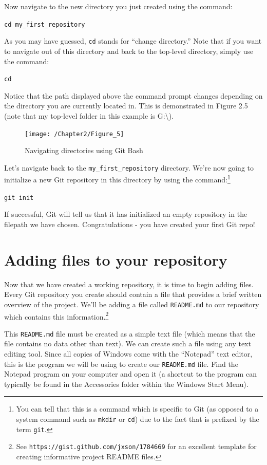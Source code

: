 \documentclass{book}
\begin{document}
Now navigate to the new directory you just created using the command:

\texttt{cd my\_first\_repository}

As you may have guessed, \texttt{cd} stands for ``change directory.'' Note that if you want to navigate out of this directory and back to the top-level directory, simply use the command:

\texttt{cd}

Notice that the path displayed above the command prompt changes depending on the directory you are currently located in. This is demonstrated in Figure 2.5 (note that my top-level folder in this example is G:\textbackslash).

\begin{figure}[h]
	\caption{Navigating directories using Git Bash}
	\centering\texttt{[image: /Chapter2/Figure\_5]}
\end{figure}

Let's navigate back to the \texttt{my\_first\_repository} directory. We're now going to initialize a new Git repository in this directory by using the command:{\footnote {You can tell that this is a command which is specific to Git (as opposed to a system command such as \texttt{mkdir} or \texttt{cd}) due to the fact that is prefixed by the term \texttt{git}.}} 

\texttt{git init}

If successful, Git will tell us that it has initialized an empty repository in the filepath we have chosen. Congratulations - you have created your first Git repo!

\section{Adding files to your repository}
Now that we have created a working repository, it is time to begin adding files. Every Git repository you create should contain a file that provides a brief written overview of the project. We'll be adding a file called \texttt{README.md} to our repository which contains this information.\footnote{See \texttt{https://gist.github.com/jxson/1784669} for an excellent template for creating informative project README files.}

This \texttt{README.md} file must be created as a simple text file (which means that the file contains no data other than text). We can create such a file using any text editing tool. Since all copies of Windows come with the ``Notepad'' text editor, this is the program we will be using to create our \texttt{README.md} file. Find the Notepad program on your computer and open it (a shortcut to the program can typically be found in the Accessories folder within the Windows Start Menu).
\end{document}
